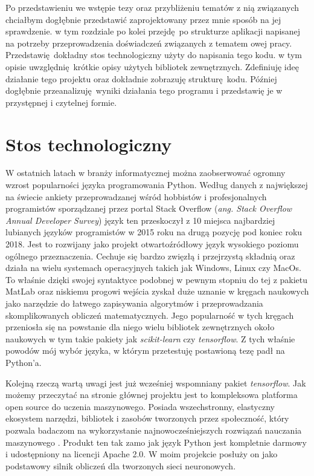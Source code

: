 \documentclass[12pt, oneside, a4paper]{report}
\begin{document}
Po przedstawieniu we wstępie tezy oraz przybliżeniu tematów z nią związanych chciałbym dogłębnie przedstawić zaprojektowany przez mnie sposób na jej sprawdzenie. w tym rozdziale po kolei przejdę po strukturze aplikacji napisanej na potrzeby przeprowadzenia doświadczeń związanych z tematem owej pracy. Przedstawię dokładny stos technologiczny użyty do napisania tego kodu. w tym opisie uwzględnię krótkie opisy użytych bibliotek zewnętrznych. Zdefiniuję ideę działanie tego projektu oraz dokładnie zobrazuję strukturę kodu. Później dogłębnie przeanalizuję wyniki działania tego programu i przedstawię je w przystępnej i czytelnej formie.

\section{Stos technologiczny}

W ostatnich latach w branży informatycznej można zaobserwować ogromny wzrost popularności języka programowania Python. Według danych z największej na świecie ankiety przeprowadzanej wśród hobbistów i profesjonalnych programistów sporządzanej przez portal Stack Overflow (\textit{ang. Stack Overflow Annual Developer Survey}) \citep{stackoverflow-survey} język ten przeskoczył z 10 miejsca najbardziej lubianych języków programistów w 2015 roku na drugą pozycję pod koniec roku 2018. Jest to rozwijany jako projekt otwartoźródłowy język wysokiego poziomu ogólnego przeznaczenia. Cechuje się bardzo zwięzłą i przejrzystą składnią oraz działa na wielu systemach operacyjnych takich jak Windows, Linux czy MacOs. To właśnie dzięki swojej syntaktyce podobnej w pewnym stopniu do tej z pakietu MatLab oraz niskiemu progowi wejścia zyskał duże uznanie w kręgach naukowych jako narzędzie do łatwego zapisywania algorytmów i przeprowadzania skomplikowanych obliczeń matematycznych. Jego popularność w tych kręgach przeniosła się na powstanie dla niego wielu bibliotek zewnętrznych około naukowych w tym takie pakiety jak \textit{scikit-learn} czy \textit{tensorflow}. Z tych właśnie powodów mój wybór języka, w którym przetestuję postawioną tezę padł na Python'a.

Kolejną rzeczą wartą uwagi jest już wcześniej wspomniany pakiet \textit{tensorflow}. Jak możemy przeczytać na stronie głównej projektu jest to kompleksowa platforma open source do uczenia maszynowego. Posiada wszechstronny, elastyczny ekosystem narzędzi, bibliotek i zasobów tworzonych przez społeczność, który pozwala badaczom na wykorzystanie najnowocześniejszych rozwiązań nauczania maszynowego \citep{tensorflow-wesite}. Produkt ten tak zamo jak język Python jest kompletnie darmowy i udostępniony na licencji Apache 2.0. W moim projekcie posłuży on jako podstawowy silnik obliczeń dla tworzonych sieci neuronowych.
\end{document}
